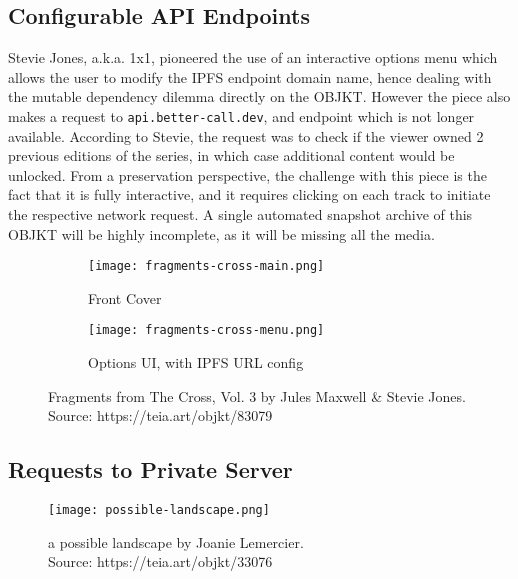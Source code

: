 \subsection{Configurable API Endpoints}

Stevie Jones, a.k.a. 1x1, pioneered the use of an interactive options menu which allows the user to modify the IPFS endpoint domain name, hence dealing with the mutable dependency dilemma directly on the OBJKT. However the piece also makes a request to \texttt{api.better-call.dev}, and endpoint which is not longer available. According to Stevie, the request was to check if the viewer owned 2 previous editions of the series, in which case additional content would be unlocked. From a preservation perspective, the challenge with this piece is the fact that it is fully interactive, and it requires clicking on each track to initiate the respective network request. A single automated snapshot archive of this OBJKT will be highly incomplete, as it will be missing all the media.

\begin{figure}[H]
  \centering
  \captionsetup{justification=centering}
  \begin{subfigure}[b]{0.45\textwidth}
    \centering
    \texttt{[image: fragments-cross-main.png]}
    \caption{Front Cover}
    \label{fig:vdp1}
  \end{subfigure}
  \hfill
  \begin{subfigure}[b]{0.45\textwidth}
    \centering
    \texttt{[image: fragments-cross-menu.png]}
    \caption{Options UI, with IPFS URL config}
    \label{fig:vdp2}
  \end{subfigure}
  \caption{Fragments from The Cross, Vol. 3 by Jules Maxwell \& Stevie Jones. \\ Source: https://teia.art/objkt/83079}
  \label{fig:vdp-examples}
\end{figure}


\subsection{Requests to Private Server}


\begin{figure}[h]
    \centering
    \captionsetup{justification=centering}
    \texttt{[image: possible-landscape.png]}
    \captionsetup{justification=centering}
    \caption[a possible landscape by Joanie Lemercier]{a possible landscape by Joanie Lemercier. \\ Source: https://teia.art/objkt/33076}
    \label{fig:vdp}
\end{figure}

